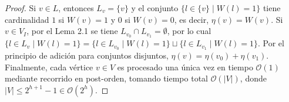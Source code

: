 \documentclass[11pt, a4paper]{article}
\theoremstyle{definition}
\theoremstyle{plain}
\begin{document}
\begin{proof}
Si $v \in L$, entonces $L_v = \{v\}$ y el conjunto $\{l \in \{v\} \mid W(l) = 1\}$ tiene cardinalidad $1$ si $W(v) = 1$ y $0$ si $W(v) = 0$, es decir, $\eta(v) = W(v)$. Si $v \in V_I$, por el Lema 2.1 se tiene $L_{v_0} \cap L_{v_1} = \emptyset$, por lo cual $\{l \in L_v \mid W(l) = 1\} = \{l \in L_{v_0} \mid W(l) = 1\} \sqcup \{l \in L_{v_1} \mid W(l) = 1\}$. Por el principio de adición para conjuntos disjuntos, $\eta(v) = \eta(v_0) + \eta(v_1)$. Finalmente, cada vértice $v \in V$ es procesado una única vez en tiempo $\mathcal{O}(1)$ mediante recorrido en post-orden, tomando tiempo total $\mathcal{O}(|V|)$, donde $|V| \leq 2^{h+1} - 1 \in \mathcal{O}(2^h)$.
\end{proof}
\end{document}
